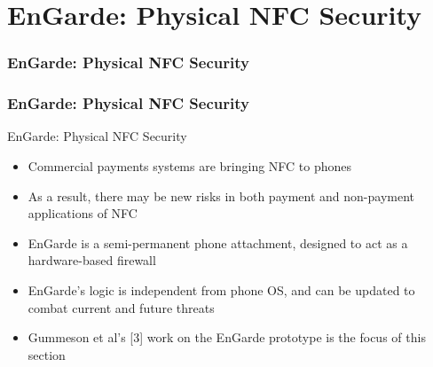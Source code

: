 \documentclass[unknownkeysallowed]{beamer}
\begin{document}
\section{EnGarde: Physical NFC Security}
\begin{frame}
\frametitle{EnGarde: Physical NFC Security}
\begin{center}\begin{minipage}{.9\textwidth}
\tableofcontents[currentsubsection, hideothersubsections, sectionstyle=show/shaded]
\end{minipage}\end{center}
\end{frame}
%

\begin{frame}
\frametitle{EnGarde: Physical NFC Security}
  \begin{center}
  \begin{minipage}{.9\textwidth}
  \begin{block}{EnGarde: Physical NFC Security}
    \begin{itemize}
      \item{Commercial payments systems are bringing NFC to phones}
      \pause
      \vspace{1mm}
      \item{As a result, there may be new risks in both payment and non-payment applications of NFC}
      \pause
      \vspace{1mm}
      \item{EnGarde is a semi-permanent phone attachment, designed to act as a hardware-based firewall}
      \pause
      \vspace{1mm}
      \item{EnGarde's logic is independent from phone OS, and can be updated to combat current and future threats}
      \pause
      \vspace{1mm}
      \item{Gummeson et al's [3] work on the EnGarde prototype is the focus of this section}
    \end{itemize}
  \end{block}
  \end{minipage}
  \end{center}
\end{frame}
\end{document}
